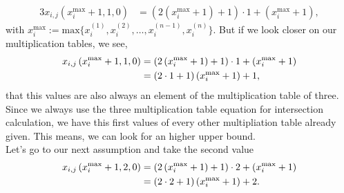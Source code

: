 \begin{enumerate}
	\begin{alignat}{3}
		x_{i,j}\left(x_{i}^{\mathrm{max}} + 1,1,0\right) &= \left(2\left(x_{i}^{\mathrm{max}} + 1\right) + 1\right) \cdot 1 + \left(x_{i}^{\mathrm{max}} + 1\right), \label{eq:firstassumption}
	\end{alignat}
	with $x_{i}^{\mathrm{max}} := \mathrm{max}\{ x_{i}^{\left(1\right)}, x_{i}^{\left(2\right)}, \dots, x_{i}^{\left(n-1\right)}, x_{i}^{\left(n\right)} \}$. But if we look closer on our multiplication tables, we see,
	\begin{alignat}{3}
	x_{i,j}\left(x_{i}^{\mathrm{max}} + 1,1,0\right) &= \left(2\left(x_{i}^{\mathrm{max}} + 1\right) + 1\right) \cdot 1 + \left(x_{i}^{\mathrm{max}} + 1\right) \notag \\
	&= \left(2 \cdot 1 + 1\right)\left(x_{i}^{\mathrm{max}} + 1\right) + 1, \label{eq:firstvalue}
	\end{alignat}
	that this values are also always an element of the multiplication table of three. Since we always use the three multiplication table equation for intersection calculation, we have this first values of every other multipliation table already given. This means, we can look for an higher upper bound. \\

	Let's go to our next assumption and take the second value
	\begin{alignat}{3}
		x_{i,j}\left(x_{i}^{\mathrm{max}} + 1,2,0\right) &= \left(2\left(x_{i}^{\mathrm{max}} + 1\right) + 1\right) \cdot 2 + \left(x_{i}^{\mathrm{max}} + 1\right) \notag \\
	&= \left(2 \cdot 2 + 1\right)\left(x_{i}^{\mathrm{max}} + 1\right) + 2. \label{eq:secondassumption}
	\end{alignat}


\end{enumerate}
